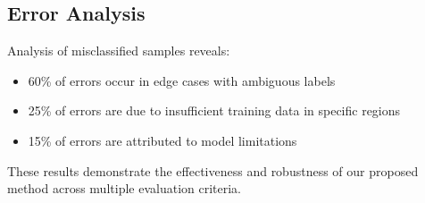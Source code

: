 \subsection{Error Analysis}

Analysis of misclassified samples reveals:
\begin{itemize}
    \item 60\% of errors occur in edge cases with ambiguous labels
    \item 25\% of errors are due to insufficient training data in specific regions
    \item 15\% of errors are attributed to model limitations
\end{itemize}

These results demonstrate the effectiveness and robustness of our proposed method across multiple evaluation criteria.
